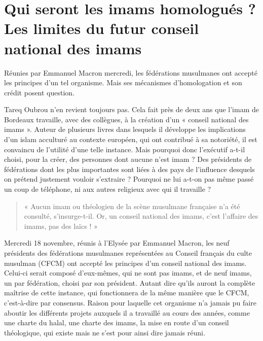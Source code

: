 \section*{Qui seront les imams homologués ? Les limites du futur conseil national des imams}


Réunies par Emmanuel Macron mercredi, les fédérations musulmanes ont accepté les principes d’un tel organisme. Mais ses mécanismes d’homologation et son crédit posent question. 

Tareq Oubrou n’en revient toujours pas. Cela fait près de deux ans que l’imam de Bordeaux travaille, avec des collègues, à la création d’un « conseil national des imams ». Auteur de plusieurs livres dans lesquels il développe les implications d’un islam acculturé au contexte européen, qui ont contribué à sa notoriété, il est convaincu de l’utilité d’une telle instance.
Mais pourquoi donc l’exécutif a-t-il choisi, pour la créer, des personnes dont aucune n’est imam ? Des présidents de fédérations dont les plus importantes sont liées à des pays de l’influence desquels on prétend justement vouloir s’extraire ? Pourquoi ne lui a-t-on pas même passé un coup de téléphone, ni aux autres religieux avec qui il travaille ? 
\begin{quote}
    « Aucun imam ou théologien de la scène musulmane française n’a été consulté, s’insurge-t-il. Or, un conseil national des imams, c’est l’affaire des imams, pas des laïcs ! »
\end{quote}

Mercredi 18 novembre, réunis à l’Elysée par Emmanuel Macron, les neuf présidents des fédérations musulmanes représentées au Conseil français du culte musulman (CFCM) ont accepté les principes d’un conseil national des imams. Celui-ci serait composé d’eux-mêmes, qui ne sont pas imams, et de neuf imams, un par fédération, choisi par son président. Autant dire qu’ils auront la complète maîtrise de cette instance, qui fonctionnera de la même manière que le CFCM, c’est-à-dire par consensus. Raison pour laquelle cet organisme n’a jamais pu faire aboutir les différents projets auxquels il a travaillé au cours des années, comme une charte du halal, une charte des imams, la mise en route d’un conseil théologique, qui existe mais ne s’est pour ainsi dire jamais réuni.
 
